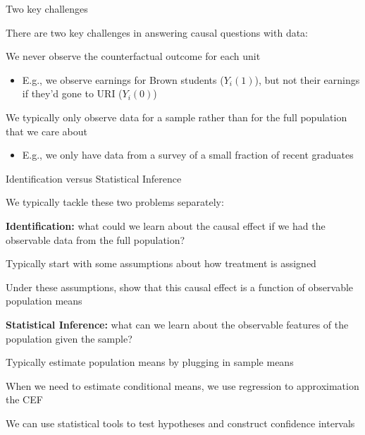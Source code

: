 \documentclass[11pt,english,handout]{beamer}
\newenvironment{wideitemize}{\itemize\addtolength{\itemsep}{10pt}}{\enditemize}
\begin{document}
\begin{frame}{Two key challenges}

There are two key challenges in answering causal questions with data:	\medskip 
	
	\begin{wideitemize}
		\item
		We never observe the counterfactual outcome for each unit
			\begin{itemize}
				\item
				E.g., we observe earnings for Brown students ($Y_i(1)$), but not their earnings if they'd gone to URI ($Y_i(0)$) 
			\end{itemize} 
		
		\item
		We typically only observe data for a sample rather than for the full population that we care about
		\begin{itemize}
			\item
			E.g., we only have data from a survey of a small fraction of recent graduates 
		\end{itemize}
	\end{wideitemize}

\end{frame}

\begin{frame}{Identification versus Statistical Inference}

We typically tackle these two problems separately: \medskip	
	
	\pause 
	
	\begin{wideitemize}
		\item
		\textbf{Identification:} what could we learn about the causal effect if we had the observable data from the full population? 
		\pause
			\begin{wideitemize}
				\item
				Typically start with some assumptions about how treatment is assigned
				
				\item
				Under these assumptions, show that this causal effect is a function of observable population means
			\end{wideitemize}
		\pause
		\item
		\textbf{Statistical Inference:} what can we learn about the observable features of the population given the sample? \pause
			\begin{wideitemize}
				\item
				Typically estimate population means by plugging in sample means
				
				\item
				When we need to estimate conditional means, we use regression to approximation the CEF
				
				\item
				We can use statistical tools to test hypotheses and construct confidence intervals
			\end{wideitemize}		
	\end{wideitemize}
\end{frame}
\end{document}
